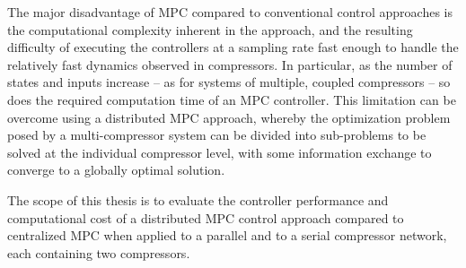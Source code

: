 The major disadvantage of MPC compared to conventional control approaches is the computational complexity inherent in the approach, and the resulting difficulty of executing the controllers at a sampling rate fast enough to handle the relatively fast dynamics observed in compressors. 
In particular, as the number of states and inputs increase -- as for systems of multiple, coupled compressors -- so does the required computation time of an MPC controller.
This limitation can be overcome using a distributed MPC approach, whereby the optimization problem posed by a multi-compressor system can be divided into sub-problems to be solved at the individual compressor level, with some information exchange to converge to a globally optimal solution. 

The scope of this thesis is to evaluate the controller performance and computational cost of a distributed MPC control approach compared to centralized MPC when applied to a parallel and to a serial compressor network, each containing two compressors.

